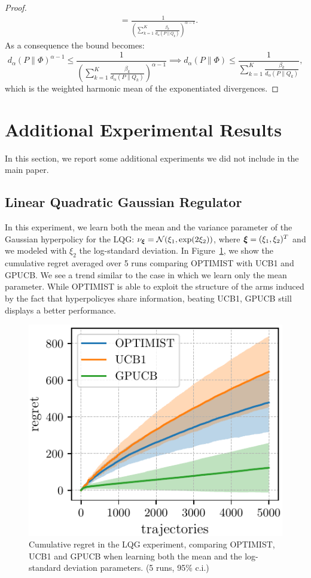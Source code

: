 \documentclass{article}
\makeatletter
\DeclareRobustCommand{\algoname}{OPTIMIST\@\xspace}
\makeatother
\begin{document}
\begin{proof}
\begin{align*}
        & = \frac{1} {\left(\sum_{k=1}^K \frac{ \beta_k}{ d_{\alpha}(P \| Q_k)}\right)^{\alpha-1}}.
    \end{align*}
    As a consequence the bound becomes:
    \begin{equation*}
        d_{\alpha}(P \| \Phi)^{\alpha-1} \le  \frac{1} {\left(\sum_{k=1}^K \frac{\beta_k}{ d_{\alpha}(P \| Q_k)}\right)^{\alpha-1}} \implies  d_{\alpha}(P \| \Phi) \le \frac{1} {\sum_{k=1}^K \frac{ \beta_k}{ d_{\alpha}(P \| Q_k)}},
    \end{equation*}
    which is the weighted harmonic mean of the exponentiated divergences.
\end{proof}

\section{Additional Experimental Results}
\label{apx:additionalExperiments}
In this section, we report some additional experiments we did not include in the main paper.

\subsection{Linear Quadratic Gaussian Regulator}
In this experiment, we learn both the mean and the variance parameter of the Gaussian hyperpolicy
for the LQG: $\nu_{\boldsymbol{\xi}} = \mathcal{N}(\xi_1, \exp(2\xi_2))$, where $\boldsymbol{\xi}=(\xi_1,\xi_2)^T$ and we modeled with $\xi_2$ the log-standard deviation. In Figure~\ref{fig:lqgVar}, we show the cumulative regret averaged over 5 runs comparing \algoname with UCB1 and GPUCB. We see a
trend similar to the case in which we learn only the mean parameter. While \algoname is able to exploit
the structure of the arms induced by the fact that hyperpolicyes share information, beating UCB1, GPUCB still displays a better performance.
\begin{figure}[h!] 
\vskip 0.2in
    \centering
    \includegraphics[width=0.3\linewidth]{plots/LQG_mu_sigma.pdf}
    \caption{Cumulative regret in the LQG experiment, comparing \algoname, UCB1 and GPUCB  when learning both the mean and the log-standard deviation parameters. (5 runs, 95\% c.i.)} 
    \label{fig:lqgVar} 
  \vskip -0.2in
\end{figure}

\end{document}
